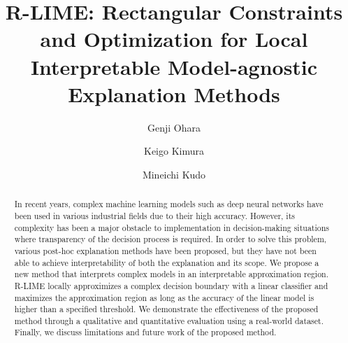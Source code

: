 \documentclass[runningheads]{llncs}
\begin{document}
%
\title{%
  R-LIME: Rectangular Constraints and Optimization for Local Interpretable
  Model-agnostic Explanation Methods}
%
%
\author{Genji Ohara \and
  Keigo Kimura \and
  Mineichi Kudo
}
%
%

\maketitle              %
%

\begin{abstract}
  In recent years, complex machine learning models such as deep neural networks
  have been used in various industrial fields due to their high accuracy.
  However, its complexity has been a major obstacle to implementation
  in decision-making situations where transparency of the decision process is required.
  In order to solve this problem,
  various post-hoc explanation methods have been proposed,
  but they have not been able to achieve interpretability of
  both the explanation and its scope.
  We propose a new method that interprets complex models in an interpretable
  approximation region.
  R-LIME locally approximizes a complex decision boundary with a linear classifier
  and maximizes the approximation region as long as the accuracy of the linear
  model is higher than a specified threshold.
  We demonstrate the effectiveness of the proposed method through a qualitative
  and quantitative evaluation using a real-world dataset.
  Finally, we discuss limitations and future work of the proposed method.
\end{abstract}
\end{document}
